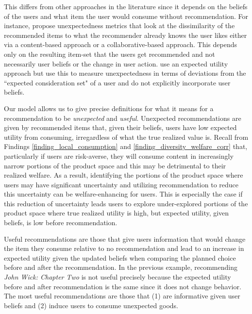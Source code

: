 \documentclass[sigconf]{acmart}
\begin{document}
This differs from other approaches in the literature since it depends on the beliefs of the users and what item the user would consume without recommendation. For instance, \cite{vargas2011rank, kaminskas2014measuring} propose unexpectedness metrics that look at the dissimilarity of the recommended items to what the recommender already knows the user likes either via a content-based approach or a collaborative-based approach. This depends only on the resulting item-set that the users get recommended and not necessarily user beliefs or the change in user action. \cite{adamopoulos2014unexpectedness} use an expected utility approach but use this to measure unexpectedness in terms of deviations from the ``expected consideration set" of a user and do not explicitly incorporate user beliefs.
\par

Our model allows us to give precise definitions for what it means for a recommendation to be \textit{unexpected} and \textit{useful}. Unexpected recommendations are given by recommended items that, given their beliefs, users have low expected utility from consuming, irregardless of what the true realized value is. Recall from Findings \ref{finding_local_consumption} and \ref{finding_diversity_welfare_corr} that, particularly if users are risk-averse, they will consume content in increasingly narrow portions of the product space and this may be detrimental to their realized welfare. As a result, identifying the portions of the product space where users may have significant uncertainty and utilizing recommendation to reduce this uncertainty can be welfare-enhancing for users. This is especially the case if this reduction of uncertainty leads users to explore under-explored portions of the product space where true realized utility is high, but expected utility, given beliefs, is low before recommendation.
\par

Useful recommendations are those that give users information that would change the item they consume relative to no recommendation and lead to an increase in expected utility given the updated beliefs when comparing the planned choice before and after the recommendation. In the previous example, recommending \textit{John Wick: Chapter Two} is not useful precisely because the expected utility before and after recommendation is the same since it does not change behavior. The most useful recommendations are those that (1) are informative given user beliefs and (2) induce users to consume unexpected goods.
\par
\end{document}
